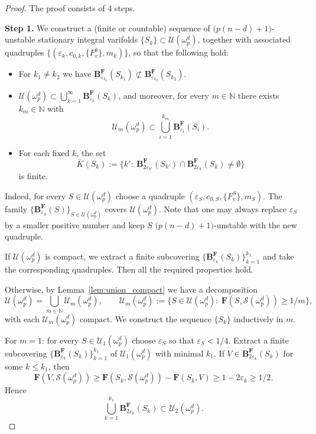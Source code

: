\documentclass[12pt,english]{article}
\theoremstyle{definition}
\begin{document}
\begin{proof}
The proof consists of 4 steps.

\textbf{Step 1.} We construct a (finite or countable) sequence of \(\bigl(p(n-d)+1\bigr)\)-unstable stationary integral varifolds
\(\{S_k\}\subset\mathcal{U}(\omega^d_p)\), together with associated quadruples
\(\{(\varepsilon_k,c_{0,k},\{F^k_v\},m_k)\}\), so that the following hold:

\begin{itemize}
    \item For \(k_1\neq k_2\) we have \(\mathbf B^\mathbf F_{\varepsilon_{k_1}}(S_{k_1})\not\subset \mathbf B^\mathbf F_{\varepsilon_{k_2}}(S_{k_2})\).
    \item \(\mathcal{U}(\omega^d_p)\subset\bigcup_{k=1}^\infty \mathbf B^\mathbf F_{\varepsilon_k}(S_k)\), and moreover, for every \(m\in\mathbb N\) there exists \(k_m\in\mathbb N\) with
    \[
        \mathcal{U}_m(\omega^d_p)\subset\bigcup_{i=1}^{k_m}\mathbf B^\mathbf F_{\varepsilon_i}(S_i).
    \]
    \item For each fixed \(k\), the set
    \[
        \bar K(S_k):=\{k':\ \mathbf B^\mathbf F_{2\varepsilon_{k'}}(S_{k'})\cap\mathbf B^\mathbf F_{2\varepsilon_k}(S_k)\neq\emptyset\}
    \]
    is finite.
\end{itemize}

Indeed, for every \(S\in\mathcal{U}(\omega^d_p)\) choose a quadruple \((\varepsilon_S,c_{0,S},\{F^S_v\},m_S)\). The family \(\{\mathbf B^\mathbf F_{\varepsilon_S}(S)\}_{S\in\mathcal{U}(\omega^d_p)}\) covers \(\mathcal{U}(\omega^d_p)\). Note that one may always replace \(\varepsilon_S\) by a smaller positive number and keep \(S\) \(\bigl(p(n-d)+1\bigr)\)-unstable with the new quadruple.

If \(\mathcal{U}(\omega^d_p)\) is compact, we extract a finite subcovering \(\{\mathbf B^\mathbf F_{\varepsilon_k}(S_k)\}_{k=1}^{k_1}\) and take the corresponding quadruples. Then all the required properties hold.

Otherwise, by Lemma~\ref{lem:union_compact} we have a decomposition
\[
    \mathcal{U}(\omega^d_p)=\bigcup_{m\in\mathbb N}\mathcal{U}_m(\omega^d_p),
\qquad
\mathcal{U}_m(\omega^d_p):=\{S\in\mathcal{U}(\omega^d_p):\ \mathbf F(S,\mathcal{S}(\omega^d_p))\ge 1/m\},
\]
with each \(\mathcal{U}_m(\omega^d_p)\) compact. We construct the sequence \(\{S_k\}\) inductively in \(m\).

For \(m=1\): for every \(S\in\mathcal{U}_1(\omega^d_p)\) choose \(\varepsilon_S\) so that \(\varepsilon_S<1/4\). Extract a finite subcovering \(\{\mathbf B^\mathbf F_{\varepsilon_k}(S_k)\}_{k=1}^{k_1}\) of \(\mathcal{U}_1(\omega^d_p)\) with minimal \(k_1\). If \(V\in\mathbf B^\mathbf F_{2\varepsilon_k}(S_k)\) for some \(k\le k_1\), then
\[
    \mathbf F(V,\mathcal{S}(\omega^d_p)) \ge \mathbf F(S_k,\mathcal{S}(\omega^d_p)) - \mathbf F(S_k,V)
    \ge 1 - 2\varepsilon_k \ge 1/2.
\]
Hence
\[
    \bigcup_{k=1}^{k_1}\mathbf B^\mathbf F_{2\varepsilon_k}(S_k) \subset \mathcal{U}_2(\omega^d_p).
\]


\end{proof}
\end{document}
